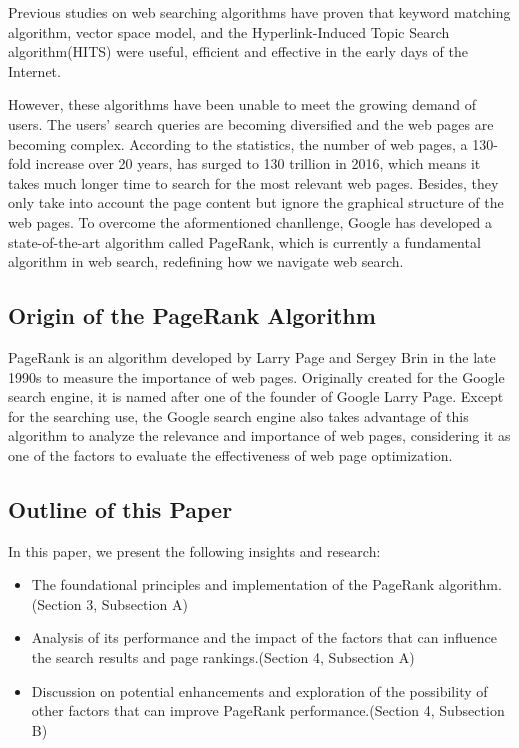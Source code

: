 \documentclass[lettersize,journal,12pt]{IEEEtran}
\begin{document}
Previous studies on web searching algorithms have proven that keyword matching algorithm\cite{ref1}, vector space model\cite{ref2}, and the Hyperlink-Induced Topic Search algorithm(HITS)\cite{ref3} were useful, efficient and effective in the early days of the Internet.

However, these algorithms have been unable to meet the growing demand of users. The users' search queries are becoming diversified and the web pages are becoming complex. 
According to the statistics, the number of web pages, a 130-fold increase over 20 years, has surged to 130 trillion in 2016, which means it takes much longer time to search for the most relevant web pages.
Besides, they only take into account the page content but ignore the graphical structure of the web pages.
To overcome the aformentioned chanllenge, Google has developed a state-of-the-art algorithm called PageRank, which is currently a fundamental algorithm in web search, redefining how we navigate web search.

\subsection{Origin of the PageRank Algorithm} 

PageRank is an algorithm developed by Larry Page and Sergey Brin in the late 1990s to measure the importance of web pages. 
Originally created for the Google search engine, it is named after one of the founder of Google Larry Page. Except for the searching use, the Google search engine also takes advantage of this algorithm to analyze the relevance and importance of web pages, considering it as one of the factors to evaluate the effectiveness of web page optimization. 

\subsection{Outline of this Paper}

In this paper, we present the following insights and research:
\begin{itemize}
	\item The foundational principles and implementation of the PageRank algorithm.(Section 3, Subsection A)
	\item Analysis of its performance and the impact of the factors that can influence the search results and page rankings.(Section 4, Subsection A)
	\item Discussion on potential enhancements and exploration of the possibility of other factors that can improve PageRank performance.(Section 4, Subsection B)
\end{itemize}
\end{document}
